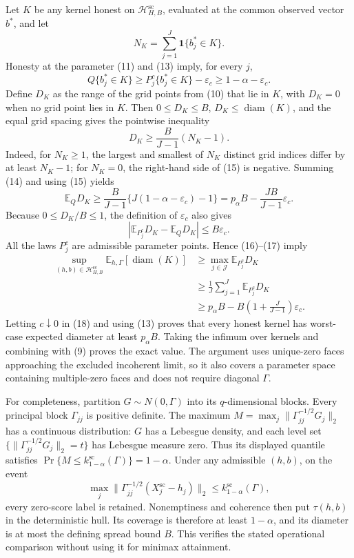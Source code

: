 Let \(K\) be any kernel honest on \(\mathcal H_{H,B}^{\mathrm{sc}}\), evaluated at the common observed vector \(b^*\), and let
\[
 N_K=\sum_{j=1}^J\mathbf 1\{b_j^*\in K\}.
\]
Honesty at the parameter (11) and (13) imply, for every \(j\),
\[
 Q\{b_j^*\in K\}
 \geq P_j^c\{b_j^*\in K\}-\varepsilon_c
 \geq1-\alpha-\varepsilon_c.
 \tag{14}
\]
Define \(D_K\) as the range of the grid points from (10) that lie in \(K\), with \(D_K=0\) when no grid point lies in \(K\). Then \(0\leq D_K\leq B\), \(D_K\leq\operatorname{diam}(K)\), and the equal grid spacing gives the pointwise inequality
\[
 D_K\geq\frac{B}{J-1}(N_K-1).
 \tag{15}
\]
Indeed, for \(N_K\geq1\), the largest and smallest of \(N_K\) distinct grid indices differ by at least \(N_K-1\); for \(N_K=0\), the right-hand side of (15) is negative. Summing (14) and using (15) yields
\[
 \mathbb E_QD_K
 \geq\frac{B}{J-1}\{J(1-\alpha-\varepsilon_c)-1\}
 =p_\alpha B-\frac{JB}{J-1}\varepsilon_c.
 \tag{16}
\]
Because \(0\leq D_K/B\leq1\), the definition of \(\varepsilon_c\) also gives
\[
 \left|\mathbb E_{P_j^c}D_K-\mathbb E_QD_K\right|
 \leq B\varepsilon_c.
 \tag{17}
\]
All the laws \(P_j^c\) are admissible parameter points. Hence (16)--(17) imply
\[
\begin{aligned}
 \sup_{(h,b)\in\mathcal H_{H,B}^{\mathrm{sc}}}
 \mathbb E_{h,\Gamma}[\operatorname{diam}(K)]
 &\geq \max_{j\in\mathcal J}\mathbb E_{P_j^c}D_K\\
 &\geq \frac1J\sum_{j=1}^J\mathbb E_{P_j^c}D_K\\
 &\geq p_\alpha B
 -B\left(1+\frac{J}{J-1}\right)\varepsilon_c.
\end{aligned}
 \tag{18}
\]
Letting \(c\downarrow0\) in (18) and using (13) proves that every honest kernel has worst-case expected diameter at least \(p_\alpha B\). Taking the infimum over kernels and combining with (9) proves the exact value. The argument uses unique-zero faces approaching the excluded incoherent limit, so it also covers a parameter space containing multiple-zero faces and does not require diagonal \(\Gamma\).

For completeness, partition \(G\sim N(0,\Gamma)\) into its \(q\)-dimensional blocks. Every principal block \(\Gamma_{jj}\) is positive definite. The maximum \(M=\max_j\lVert\Gamma_{jj}^{-1/2}G_j\rVert_2\) has a continuous distribution: \(G\) has a Lebesgue density, and each level set \(\{\lVert\Gamma_{jj}^{-1/2}G_j\rVert_2=t\}\) has Lebesgue measure zero. Thus its displayed quantile satisfies \(\Pr\{M\leq k_{1-\alpha}^{\mathrm{sc}}(\Gamma)\}=1-\alpha\). Under any admissible \((h,b)\), on the event
\[
 \max_j\lVert\Gamma_{jj}^{-1/2}(X_j^{\mathrm{sc}}-h_j)\rVert_2
 \leq k_{1-\alpha}^{\mathrm{sc}}(\Gamma),
\]
every zero-score label is retained. Nonemptiness and coherence then put \(\tau(h,b)\) in the deterministic hull. Its coverage is therefore at least \(1-\alpha\), and its diameter is at most the defining spread bound \(B\). This verifies the stated operational comparison without using it for minimax attainment.
